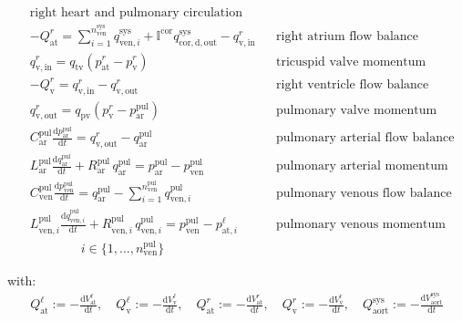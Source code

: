 \documentclass[a4paper,12pt]{report}
\begin{document}
\begin{equation}
\label{equation-syspul-2}
\begin{aligned}
&\text{right heart and pulmonary circulation} && \\
&-Q_{\mathrm{at}}^{r} = \sum\limits_{i=1}^{n_{\mathrm{ven}}^{\mathrm{sys}}}q_{\mathrm{ven},i}^{\mathrm{sys}} + \mathbb{I}^{\mathrm{cor}} q_{\mathrm{cor,d,out}}^{\mathrm{sys}} - q_{\mathrm{v,in}}^{r} && \text{right atrium flow balance}\\
&q_{\mathrm{v,in}}^{r} = q_{\mathrm{tv}}(p_{\mathrm{at}}^{r}-p_{\mathrm{v}}^{r}) && \text{tricuspid valve momentum}\\
&-Q_{\mathrm{v}}^{r} = q_{\mathrm{v,in}}^{r} - q_{\mathrm{v,out}}^{r} && \text{right ventricle flow balance}\\
&q_{\mathrm{v,out}}^{r} = q_{\mathrm{pv}}(p_{\mathrm{v}}^{r}-p_{\mathrm{ar}}^{\mathrm{pul}}) && \text{pulmonary valve momentum}\\
&C_{\mathrm{ar}}^{\mathrm{pul}} \frac{\mathrm{d}p_{\mathrm{ar}}^{\mathrm{pul}}}{\mathrm{d}t} = q_{\mathrm{v,out}}^{r} - q_{\mathrm{ar}}^{\mathrm{pul}} && \text{pulmonary arterial flow balance}\\
&L_{\mathrm{ar}}^{\mathrm{pul}} \frac{\mathrm{d}q_{\mathrm{ar}}^{\mathrm{pul}}}{\mathrm{d}t} + R_{\mathrm{ar}}^{\mathrm{pul}}\,q_{\mathrm{ar}}^{\mathrm{pul}}=p_{\mathrm{ar}}^{\mathrm{pul}} -p_{\mathrm{ven}}^{\mathrm{pul}} && \text{pulmonary arterial momentum}\\
&C_{\mathrm{ven}}^{\mathrm{pul}} \frac{\mathrm{d}p_{\mathrm{ven}}^{\mathrm{pul}}}{\mathrm{d}t} = q_{\mathrm{ar}}^{\mathrm{pul}} - \sum\limits_{i=1}^{n_{\mathrm{ven}}^{\mathrm{pul}}}q_{\mathrm{ven},i}^{\mathrm{pul}} && \text{pulmonary venous flow balance}\nonumber\\
&L_{\mathrm{ven},i}^{\mathrm{pul}} \frac{\mathrm{d}q_{\mathrm{ven},i}^{\mathrm{pul}}}{\mathrm{d}t} + R_{\mathrm{ven},i}^{\mathrm{pul}}\, q_{\mathrm{ven},i}^{\mathrm{pul}}=p_{\mathrm{ven}}^{\mathrm{pul}}-p_{\mathrm{at},i}^{\ell} && \text{pulmonary venous momentum}\\
&\qquad\qquad i \in \{1,...,n_{\mathrm{ven}}^{\mathrm{pul}}\} && 
\end{aligned}
\end{equation}

with:
\begin{equation}
\begin{aligned}
Q_{\mathrm{at}}^{\ell} := -\frac{\mathrm{d}V_{\mathrm{at}}^{\ell}}{\mathrm{d}t}, \quad
Q_{\mathrm{v}}^{\ell} := -\frac{\mathrm{d}V_{\mathrm{v}}^{\ell}}{\mathrm{d}t}, \quad
Q_{\mathrm{at}}^{r} := -\frac{\mathrm{d}V_{\mathrm{at}}^{r}}{\mathrm{d}t}, \quad
Q_{\mathrm{v}}^{r} := -\frac{\mathrm{d}V_{\mathrm{v}}^{r}}{\mathrm{d}t},
\quad
Q_{\mathrm{aort}}^{\mathrm{sys}} := -\frac{\mathrm{d}V_{\mathrm{aort}}^{\mathrm{sys}}}{\mathrm{d}t}
\end{aligned}
\end{equation}
\end{document}
